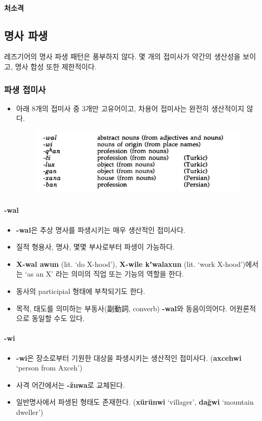 \paragraph{처소격}
\omission

\subsection{명사 파생}
레즈기어의 명사 파생 패턴은 풍부하지 않다. 몇 개의 접미사가 약간의 생산성을 보이고, 명사 합성 또한 제한적이다.
\subsubsection{파생 접미사}
\begin{itemize}
\item 아래 8개의 접미사 중 3개만 고유어이고, 차용어 접미사는 완전히 생산적이지 않다.
\begin{figure}[H]
\centerline{\includegraphics[width=.8\linewidth]{Lezgian/src/ex7-3-1.png}}
\end{figure}
\end{itemize}
\paragraph{-wal}
\begin{itemize}
\item \textbf{-wal}은 추상 명사를 파생시키는 매우 생산적인 접미사다.
\item 질적 형용사, 명사, 몇몇 부사로부터 파생이 가능하다.
\item \textbf{X-wal awun} (lit. `do X-hood'), \textbf{X-wile kʼwalaxun} (lit. `work X-hood')에서는 `as an X' 라는 의미의 직업 또는 기능의 역할을 한다.
\item 동사의 participial 형태에 부착되기도 한다. 
\item 목적, 태도를 의미하는 부동사(副動詞, converb) \textbf{-wal}와 동음이의어다. 어원론적으로 동일할 수도 있다.
\end{itemize}
\paragraph{-wi}
\begin{itemize}
\item \textbf{-wi}은 장소로부터 기원한 대상을 파생시키는 생산적인 접미사다. (\textbf{axcehwi} `person from Axceh') 
\item 사격 어간에서는 \textbf{-žuwa}로 교체된다.
\item 일반명사에서 파생된 형태도 존재한다. (\textbf{xürünwi} `villager', \textbf{dağwi} `mountain dweller')
\end{itemize}
